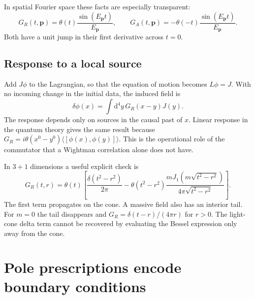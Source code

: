 \documentclass[11pt]{article}
\newcommand{\dd}{\mathrm{d}}
\begin{document}
In spatial Fourier space these facts are especially transparent:
\begin{equation}
 G_R(t,\bm p)=\theta(t)\frac{\sin(E_{\bm p}t)}{E_{\bm p}},\qquad
 G_A(t,\bm p)=-\theta(-t)\frac{\sin(E_{\bm p}t)}{E_{\bm p}}.
 \label{k-eq:RAoscillator}
\end{equation}
Both have a unit jump in their first derivative across \(t=0\).

\subsection{Response to a local source}
Add \(J\phi\) to the Lagrangian, so that the equation of motion becomes \(L\phi=J\). With no incoming change
in the initial data, the induced field is
\begin{equation}
 \delta\phi(x)=\int\dd^4y\,G_R(x-y)J(y).
 \label{k-eq:response}
\end{equation}
The response depends only on sources in the causal past of \(x\).
Linear response in the quantum theory gives the same result because
\(G_R=i\theta(x^0-y^0)\langle[\phi(x),\phi(y)]\rangle\).
This is the operational role of the commutator that a Wightman
correlation alone does not have.

In \(3+1\) dimensions a useful explicit check is
\begin{equation}
 G_R(t,r)=\theta(t)\left[
 \frac{\delta(t^2-r^2)}{2\pi}
 -\theta(t^2-r^2)\frac{mJ_1(m\sqrt{t^2-r^2})}{4\pi\sqrt{t^2-r^2}}
 \right].
 \label{k-eq:retardedexplicit}
\end{equation}
The first term propagates on the cone. A massive field also has an
interior tail. For \(m=0\) the tail disappears and
\(G_R=\delta(t-r)/(4\pi r)\) for \(r>0\). The light-cone delta term cannot
be recovered by evaluating the Bessel expression only away from the cone.

\section{Pole prescriptions encode boundary conditions}
\end{document}
